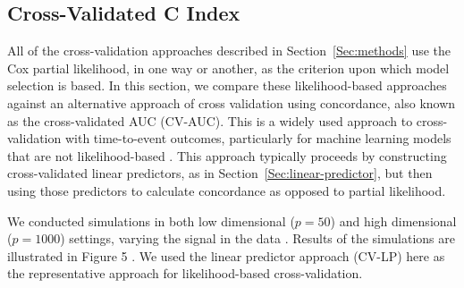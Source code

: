 \subsection {Cross-Validated C Index}

\par All of the cross-validation approaches described in Section~\ref{Sec:methods} use the Cox partial likelihood, in one way or another, as the criterion upon which model selection is based.  In this section, we compare these likelihood-based approaches against an alternative approach of cross validation using concordance, also known as the cross-validated AUC (CV-AUC).  This is a widely used approach to cross-validation with time-to-event outcomes, particularly for machine learning models that are not likelihood-based \citep{Subramanian2011,Simon2011a}. This approach typically proceeds by constructing cross-validated linear predictors, as in Section~\ref{Sec:linear-predictor}, but then using those predictors to calculate concordance as opposed to partial likelihood.

\par We conducted simulations in both low dimensional ($p = 50$) and high dimensional ($p = 1000$) settings, varying the signal in the data  . Results of the simulations are illustrated in Figure 5 .  We used the linear predictor approach (CV-LP) here as the representative approach for likelihood-based cross-validation.

